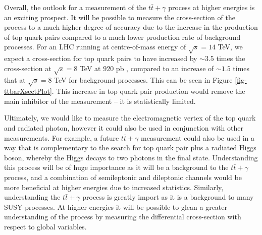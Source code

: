Overall, the outlook for a measurement of the $t\bar{t}+\gamma$ process at higher energies is an exciting prospect. It will be possible to measure the cross-section of the process to a much higher degree of accuracy due to the increase in the production of top quark pairs compared to a much lower production rate of background processes. For an LHC running at centre-of-mass energy of $\sqrt{s} = 14$ TeV, we expect a cross-section for top quark pairs to have increased by $\sim3.5$ times the cross-section at $\sqrt{s} = 8$ TeV at $920$ pb \cite{Czakon:2013goa}, compared to an increase of $\sim1.5$ times that at $\sqrt{s} = 8$ TeV for background processes. This can be seen in Figure \ref{fig-ttbarXsectPlot}. This increase in top quark pair production would remove the main inhibitor of the measurement -- it is statistically limited.

Ultimately, we would like to measure the electromagnetic vertex of the top quark and radiated photon, however it could also be used in conjunction with other measurements. For example, a future $t\bar{t}+\gamma$ measurement could also be used in a way that is complementary to the search for top quark pair plus a radiated Higgs boson, whereby the Higgs decays to two photons in the final state. Understanding this process will be of huge importance as it will be a background to the $t\bar{t}+\gamma$ process, and a combination of semileptonic and dileptonic channels would be more beneficial at higher energies due to increased statistics. Similarly, understanding the $t\bar{t}+\gamma$ process is greatly import as it is a background to many SUSY processes. At higher energies it will be possible to glean a greater understanding of the process by measuring the differential cross-section with respect to global variables. 

